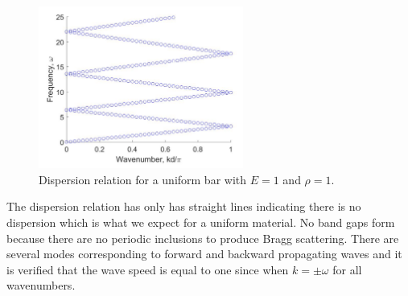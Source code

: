 \documentclass{article}
\begin{document}
\begin{figure}[!htbp]
	\centering
	\includegraphics[width=0.6\textwidth]{unifbar.pdf}
	\caption{Dispersion relation for a uniform bar with $E=1$ and $\rho=1$.}
	\label{fig:unifbar}
\end{figure}
The dispersion relation has only has straight lines indicating there is no 
dispersion which is what we expect for a uniform material. No band gaps form 
because there are no periodic inclusions to produce Bragg scattering. There are 
several modes corresponding to forward and backward propagating waves and it is 
verified that the wave speed is equal to one since when $k=\pm \omega$ for all 
wavenumbers.
\end{document}
